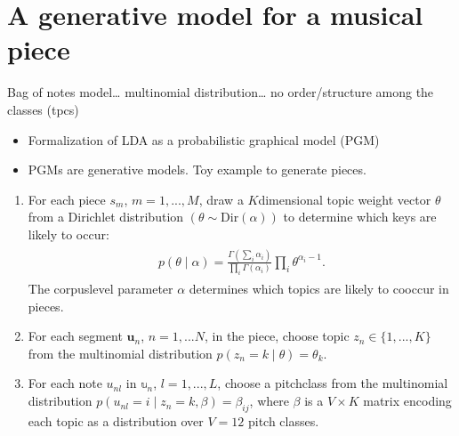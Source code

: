 \documentclass[letterpaper,10pt,english]{sphinxmanual}
\begin{document}
\section{A generative model for a musical piece}
\label{\detokenize{5_notes:a-generative-model-for-a-musical-piece}}
\sphinxAtStartPar
Bag of notes model… multinomial distribution… no order/structure
among the classes (tpcs)
\begin{itemize}
\item {} 
\sphinxAtStartPar
Formalization of LDA as a probabilistic graphical model (PGM)

\item {} 
\sphinxAtStartPar
PGMs are generative models. Toy example to generate pieces.

\end{itemize}
\begin{enumerate}
%
\item {} 
\sphinxAtStartPar
For each piece \(s_m\), \(m=1, ..., M\), draw a
\(K\)\sphinxhyphen{}dimensional topic weight vector \(\theta\) from a
Dirichlet distribution
\(\left(\theta \sim \mathrm{Dir}(\alpha)\right)\) to determine
which keys are likely to occur:
\begin{equation*}
\begin{split}\begin{aligned}
    p(\theta \mid \alpha) = \frac{\Gamma\left(\sum_i \alpha_i\right)}{\prod_i \Gamma \left(\alpha_i\right)}\prod_i \theta^{\alpha_i - 1}.
    \end{aligned}\end{split}
\end{equation*}
\sphinxAtStartPar
The corpus\sphinxhyphen{}level parameter \(\alpha\) determines which topics are
likely to co\sphinxhyphen{}occur in pieces.

\item {} 
\sphinxAtStartPar
For each segment \(\mathbf u_n\), \(n=1, ...N\), in the
piece, choose topic \(z_n \in \{1, ..., K\}\) from the
multinomial distribution \(p(z_n=k \mid \theta) = \theta_k\).

\item {} 
\sphinxAtStartPar
For each note \(u_{nl}\) in \(\mathbb u_n\),
\(l=1, ..., L\), choose a pitch\sphinxhyphen{}class from the multinomial
distribution \(p(u_{nl} = i \mid z_n=k, \beta)=\beta_{ij}\),
where \(\beta\) is a \(V \times K\) matrix encoding each
topic as a distribution over \(V=12\) pitch classes.

\end{enumerate}
\end{document}
